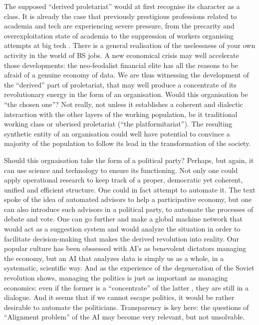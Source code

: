 \documentclass{article}
\begin{document}
The supposed ``derived proletariat'' would at first
recognise its character as a class. It is already the case that previously prestigious
professions related to academia and tech are experiencing severe pressure, from
the precarity and overexploitation state of academia \cite{ACADANON} to the suppression
of workers organising attempts at big tech \cite{GOOG}. There is a general \cite{GRAEBER}
realisation of the uselessness of your own activity in the world of BS jobs. A new economical crisis may
well accelerate those developments: the neo-feodalist financial elite has all the reasons to
be afraid of a genuine economy of data. We are thus witnessing the development of the ``derived''
part of proletariat, that may well produce a concentrate of its revolutionary energy in the form of an organisation. Would this organisation be ``the chosen one''? Not really, not unless it
establishes a coherent and dialectic interaction with the other layers of the working population,
be it traditional working class or uberised proletariat (``the platformitariat''). The resulting synthetic entity
of an organisation could well have potential to convince a majority of the population to
follow its lead in the transformation of the society.

Should this orgnaisation take the form of a political party? Perhaps, but again, it
can use science and technology to ensure its functioning. Not only one could apply
operational research \cite{BEER} to keep track of a proper, democratic yet coherent,
unified and efficient structure. One could in fact attempt to automate it. The text \cite{DWIT}
spoke of the idea of automated advisors to help a participative economy, but one can also
introduce such advisors in a political party, to automate the processes of debate and
vote. One can go further and make a global machine network that would act as a
suggestion system and would analyze the situation in order to facilitate decision-making
that makes the derived revolution into reality. Our popular culture has been obssessed
with AI's as benevolent dictators managing the economy, but an AI that analyzes
data is simply us as a whole, in a systematic, scientific way. And as the experience
of the degeneration of the Soviet revolution shows, managing the politics is just as
important as managing economics: even if the former is a ``concentrate'' of the latter \cite{LENIN},
they are still in a dialogue. And it seems that if we cannot escape politics, it would
be rather desirable to automate the politicians. Transparency is key here: the questions
of ``Alignment problem'' of the AI may become very relevant, but not unsolvable.
\end{document}
